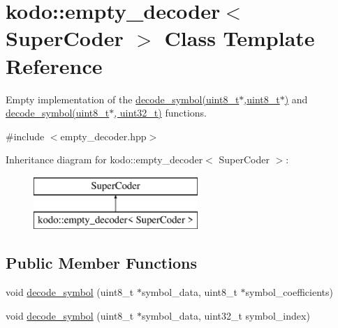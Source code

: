\hypertarget{classkodo_1_1empty__decoder}{\section{kodo\-:\-:empty\-\_\-decoder$<$ Super\-Coder $>$ Class Template Reference}
\label{classkodo_1_1empty__decoder}
}


Empty implementation of the \hyperlink{classkodo_1_1empty__decoder_aa700bffb25d17e3e2c819d36ed61308a}{decode\-\_\-symbol(uint8\-\_\-t$\ast$,uint8\-\_\-t$\ast$)} and \hyperlink{classkodo_1_1empty__decoder_aac8f8c663ddeaf9700d1a0fc50674462}{decode\-\_\-symbol(uint8\-\_\-t$\ast$, uint32\-\_\-t)} functions.  




{\ttfamily \#include $<$empty\-\_\-decoder.\-hpp$>$}

Inheritance diagram for kodo\-:\-:empty\-\_\-decoder$<$ Super\-Coder $>$\-:\begin{figure}[H]
\begin{center}
\leavevmode
\includegraphics[height=2.000000cm]{classkodo_1_1empty__decoder}
\end{center}
\end{figure}
\subsection*{Public Member Functions}
\begin{DoxyCompactItemize}
\item 
void \hyperlink{classkodo_1_1empty__decoder_aa700bffb25d17e3e2c819d36ed61308a}{decode\-\_\-symbol} (uint8\-\_\-t $\ast$symbol\-\_\-data, uint8\-\_\-t $\ast$symbol\-\_\-coefficients)
\begin{DoxyCompactList}\small\item\em \end{DoxyCompactList}\item 
void \hyperlink{classkodo_1_1empty__decoder_aac8f8c663ddeaf9700d1a0fc50674462}{decode\-\_\-symbol} (uint8\-\_\-t $\ast$symbol\-\_\-data, uint32\-\_\-t symbol\-\_\-index)
\begin{DoxyCompactList}\small\item\em \end{DoxyCompactList}\end{DoxyCompactItemize}


